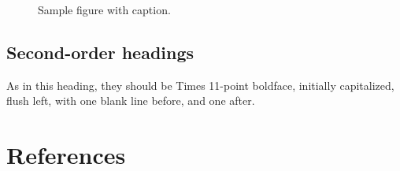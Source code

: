 \documentclass[10pt]{article}
\newcommand{\sansserifformat}[1]{\fontfamily{cmss}{ #1}}%
\begin{document}
\begin{figure}[thb]
    \centering
	\caption{Sample figure with caption.}
	\label{fig: sample-figure}       %
\end{figure}

\subsection{Second-order headings}
 
As in this heading, they should be Times 11-point boldface, initially capitalized, flush left, with one blank line before, and one after. 




\section{References} 
\end{document}
